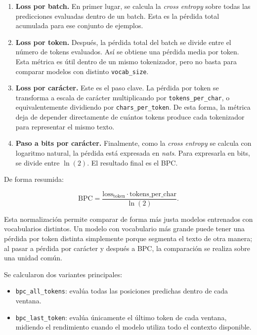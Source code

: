 ﻿\documentclass[11pt,a4paper]{article}
\begin{document}
\begin{enumerate}
    \item \textbf{Loss por batch.} En primer lugar, se calcula la \textit{cross entropy} sobre todas las predicciones evaluadas dentro de un batch. Esta es la pérdida total acumulada para ese conjunto de ejemplos.

    \item \textbf{Loss por token.} Después, la pérdida total del batch se divide entre el número de tokens evaluados. Así se obtiene una pérdida media por token. Esta métrica es útil dentro de un mismo tokenizador, pero no basta para comparar modelos con distinto \texttt{vocab\_size}.

    \item \textbf{Loss por carácter.} Este es el paso clave. La pérdida por token se transforma a escala de carácter multiplicando por \texttt{tokens\_per\_char}, o equivalentemente dividiendo por \texttt{chars\_per\_token}. De esta forma, la métrica deja de depender directamente de cuántos tokens produce cada tokenizador para representar el mismo texto.

    \item \textbf{Paso a bits por carácter.} Finalmente, como la \textit{cross entropy} se calcula con logaritmo natural, la pérdida está expresada en \textit{nats}. Para expresarla en bits, se divide entre $\ln(2)$. El resultado final es el BPC.
\end{enumerate}

De forma resumida:

\[
\mathrm{BPC} = \frac{\mathrm{loss}_{\mathrm{token}} \cdot \mathrm{tokens\_per\_char}}{\ln(2)}.
\]

Esta normalización permite comparar de forma más justa modelos entrenados con vocabularios distintos. Un modelo con vocabulario más grande puede tener una pérdida por token distinta simplemente porque segmenta el texto de otra manera; al pasar a pérdida por carácter y después a BPC, la comparación se realiza sobre una unidad común.

Se calcularon dos variantes principales:

\begin{itemize}
    \item \texttt{bpc\_all\_tokens}: evalúa todas las posiciones predichas dentro de cada ventana.
    \item \texttt{bpc\_last\_token}: evalúa únicamente el último token de cada ventana, midiendo el rendimiento cuando el modelo utiliza todo el contexto disponible.
\end{itemize}
\end{document}
